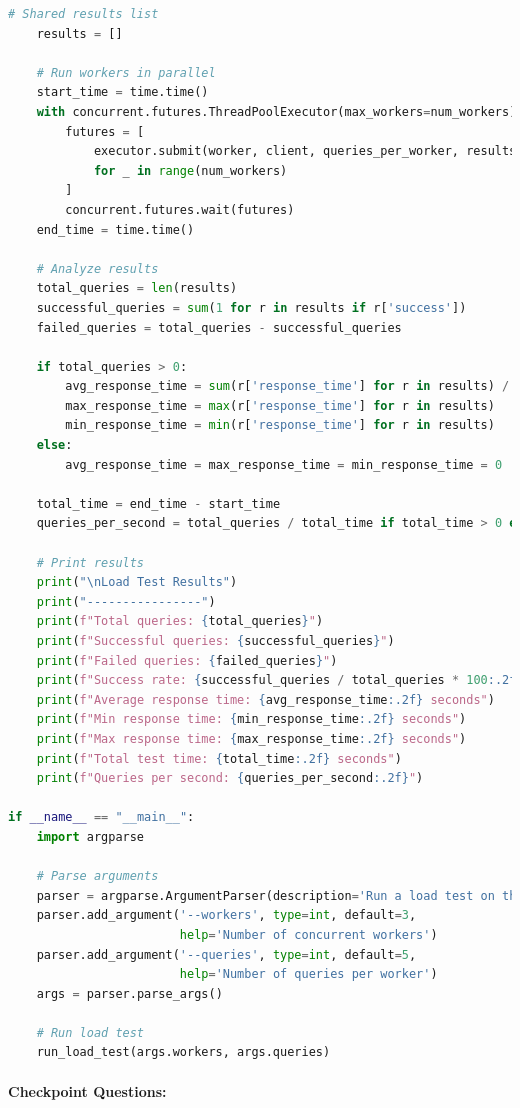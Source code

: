 \documentclass[
  screen,review,acmlarge]{acmart}
\begin{document}
\begin{lstlisting}[language=Python]
    # Shared results list
    results = []
    
    # Run workers in parallel
    start_time = time.time()
    with concurrent.futures.ThreadPoolExecutor(max_workers=num_workers) as executor:
        futures = [
            executor.submit(worker, client, queries_per_worker, results)
            for _ in range(num_workers)
        ]
        concurrent.futures.wait(futures)
    end_time = time.time()
    
    # Analyze results
    total_queries = len(results)
    successful_queries = sum(1 for r in results if r['success'])
    failed_queries = total_queries - successful_queries
    
    if total_queries > 0:
        avg_response_time = sum(r['response_time'] for r in results) / total_queries
        max_response_time = max(r['response_time'] for r in results)
        min_response_time = min(r['response_time'] for r in results)
    else:
        avg_response_time = max_response_time = min_response_time = 0
    
    total_time = end_time - start_time
    queries_per_second = total_queries / total_time if total_time > 0 else 0
    
    # Print results
    print("\nLoad Test Results")
    print("----------------")
    print(f"Total queries: {total_queries}")
    print(f"Successful queries: {successful_queries}")
    print(f"Failed queries: {failed_queries}")
    print(f"Success rate: {successful_queries / total_queries * 100:.2f}%")
    print(f"Average response time: {avg_response_time:.2f} seconds")
    print(f"Min response time: {min_response_time:.2f} seconds")
    print(f"Max response time: {max_response_time:.2f} seconds")
    print(f"Total test time: {total_time:.2f} seconds")
    print(f"Queries per second: {queries_per_second:.2f}")

if __name__ == "__main__":
    import argparse
    
    # Parse arguments
    parser = argparse.ArgumentParser(description='Run a load test on the RAG system')
    parser.add_argument('--workers', type=int, default=3,
                        help='Number of concurrent workers')
    parser.add_argument('--queries', type=int, default=5,
                        help='Number of queries per worker')
    args = parser.parse_args()
    
    # Run load test
    run_load_test(args.workers, args.queries)
\end{lstlisting}

\paragraph{Checkpoint Questions:}\label{checkpoint-questions-9}
\end{document}
